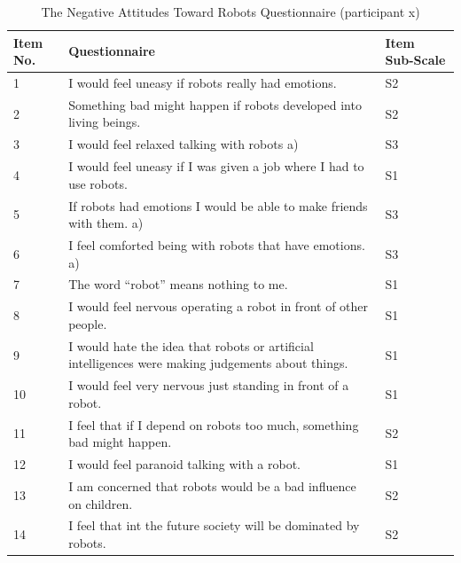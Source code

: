 \begin{table}[H]
    \begin{center}
    	\begin{tabularx}{0.9\textwidth}{|p{}|p{}|p{}|}
    		\hline
    		Item No. & Questionnaire & Item Sub-Scale \\
    		\hline
    		1 & I would feel uneasy if robots really had emotions. & S2 \\
    		2 & Something bad might happen if robots developed into living beings. & S2 \\
    		3 & I would feel relaxed talking with robots a) & S3 \\
    		4 & I would feel uneasy if I was given a job where I had to use robots. & S1 \\
    		5 & If robots had emotions I would be able to make friends with them. a) & S3 \\
    		6 & I feel comforted being with robots that have emotions. a) & S3 \\
    		7 & The word “robot” means nothing to me. & S1 \\
    		8 & I would feel nervous operating a robot in front of other people. & S1 \\
    		9 & I would hate the idea that robots or artificial intelligences were making judgements about things. & S1 \\
    		10 & I would feel very nervous just standing in front of a robot. & S1 \\
    		11 & I feel that if I depend on robots too much, something bad might happen. & S2 \\
    		12 & I would feel paranoid talking with a robot. & S1 \\
    		13 & I am concerned that robots would be a bad influence on children. & S2 \\
    		14 & I feel that int the future society will be dominated by robots. & S2 \\
    		\hline
    	\end{tabularx}
    \end{center}
    \caption{The Negative Attitudes Toward Robots Questionnaire (participant x)}
\end{table}

\enlargethispage{1em}